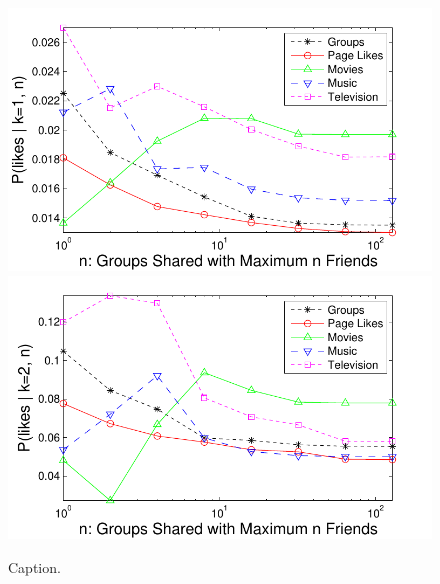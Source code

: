 \begin{figure}[t!]
\centering
\includegraphics[scale=0.65]{data/interests1_fix} \includegraphics[scale=0.65]{data/interests2_fix}
\caption{Caption.}
\label{fig:res4}
\end{figure}

